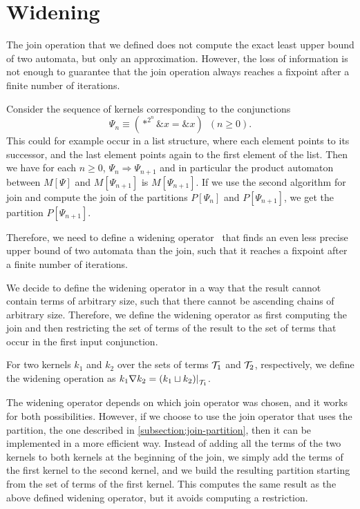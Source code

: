 \section{Widening}

The join operation that we defined does not compute the exact least upper bound of two automata, but only an approximation.
However, the loss of information is not enough to guarantee that the join operation always reaches a fixpoint after a finite number of iterations.

\begin{example}\label{ex:widen-ascending-chain}
  Consider the sequence of kernels corresponding to the conjunctions
  \[
    \Psi_n \equiv (*^{2^n} \&x = \&x)\hspace{6pt} (n\geq 0).
  \]
  This could for example occur in a list structure, where each element points to its successor, and the last element points again to the first element of the list.
  Then we have for each $n \geq 0$, $\Psi_n \Longrightarrow \Psi_{n+1}$ and in particular the product automaton between $M[\Psi]$ and $M[\Psi_{n+1}]$ is $M[\Psi_{n+1}]$.
  If we use the second algorithm for join and compute the join of the partitions $P[\Psi_n]$ and $P[\Psi_{n+1}]$, we get the partition $P[\Psi_{n+1}]$.
\end{example}

Therefore, we need to define a widening operator~\cite{widening} that finds an even less precise upper bound of two automata than the join, such that it reaches a fixpoint after a finite number of iterations.

We decide to define the widening operator in a way that the result cannot contain terms of arbitrary size, such that there cannot be ascending chains of arbitrary size.
Therefore, we define the widening operator as first computing the join and then restricting the set of terms of the result to the set of terms that occur in the first input conjunction.

\begin{definition}
  For two kernels $k_1$ and $k_2$ over the sets of terms $\mathcal{T}_1$ and $\mathcal{T}_2$, respectively, we define the widening operation as
  $k_1 \widen k_2 = \restr{(k_1 \join k_2)}{\T_1}$.
\end{definition}

The widening operator depends on which join operator was chosen, and it
works for both possibilities.
However, if we choose to use the join operator that uses the partition, the one described in \cref{subsection:join-partition},
then it can be implemented in a more efficient way.
Instead of adding all the terms of the two kernels to both kernels at the beginning of the join,
we simply add the terms of the first kernel to the second kernel,
and we build the resulting partition starting from the set of terms of the first kernel.
This computes the same result as the above defined widening operator,
but it avoids computing a restriction.

